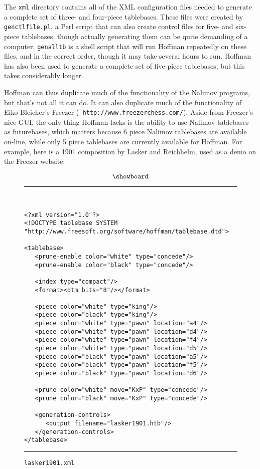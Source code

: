 \documentclass[11pt]{article}
\begin{document}
The {\tt xml} directory contains all of the XML configuration files
needed to generate a complete set of three- and four-piece tablebases.
These files were created by {\tt genctlfile.pl}, a Perl script that
can also create control files for five- and six-piece tablebases,
though actually generating them can be quite demanding of a computer.
{\tt genalltb} is a shell script that will run Hoffman repeatedly on
these files, and in the correct order, though it may take several
hours to run.  Hoffman has also been used to generate a complete set
of five-piece tablebases, but this takes considerably longer.

Hoffman can thus duplicate much of the functionality of the Nalimov
programs, but that's not all it can do.  It can also duplicate much of
the functionality of Eiko Bleicher's Freezer ({\tt
http://www.freezerchess.com/}).  Aside from Freezer's nice GUI, the
only thing Hoffman lacks is the ability to use Nalimov tablebases as
futurebases, which matters because 6 piece Nalimov tablebases are
available on-line, while only 5 piece tablebases are currently
available for Hoffman.  For example, here is a 1901 composition by
Lasker and Reichhelm, used as a demo on the Freezer website:

$$\showboard$$

\begin{figure}
\hrule\ 
{\small\begin{verbatim}
<?xml version="1.0"?>
<!DOCTYPE tablebase SYSTEM "http://www.freesoft.org/software/hoffman/tablebase.dtd">

<tablebase>
   <prune-enable color="white" type="concede"/>
   <prune-enable color="black" type="concede"/>

   <index type="compact"/>
   <format><dtm bits="8"/></format>

   <piece color="white" type="king"/>
   <piece color="black" type="king"/>
   <piece color="white" type="pawn" location="a4"/>
   <piece color="white" type="pawn" location="d4"/>
   <piece color="white" type="pawn" location="f4"/>
   <piece color="white" type="pawn" location="d5"/>
   <piece color="black" type="pawn" location="a5"/>
   <piece color="black" type="pawn" location="f5"/>
   <piece color="black" type="pawn" location="d6"/>

   <prune color="white" move="KxP" type="concede"/>
   <prune color="black" move="KxP" type="concede"/>

   <generation-controls>
      <output filename="lasker1901.htb"/>
   </generation-controls>
</tablebase>
\end{verbatim}}
\hrule
\caption{\tt lasker1901.xml}
\end{figure}
\end{document}
